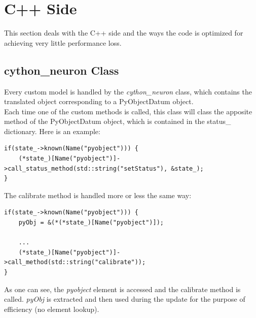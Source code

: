 \documentclass{article}
\begin{document}
\section{C++ Side}
This section deals with the C++ side and the ways the code is optimized for achieving very little performance loss.

\subsection{cython\_neuron Class}
Every custom model is handled by the \emph{cython\_neuron} class, which contains the translated object corresponding to a PyObjectDatum object.\\
Each time one of the custom methods is called, this class will class the apposite method of the PyObjectDatum object, which is contained in the status\_ dictionary. Here is an example:
\begin{verbatim}
if(state_->known(Name("pyobject"))) {
    (*state_)[Name("pyobject")]->call_status_method(std::string("setStatus"), &state_);
}
\end{verbatim}
The calibrate method is handled more or less the same way:
\begin{verbatim}
if(state_->known(Name("pyobject"))) {
    pyObj = &(*(*state_)[Name("pyobject")]);
	  
    ...
    (*state_)[Name("pyobject")]->call_method(std::string("calibrate"));
}
\end{verbatim}
As one can see, the \emph{pyobject} element is accessed and the calibrate method is called. \emph{pyObj} is extracted and then used during the update for the purpose of efficiency (no element lookup).
\end{document}
